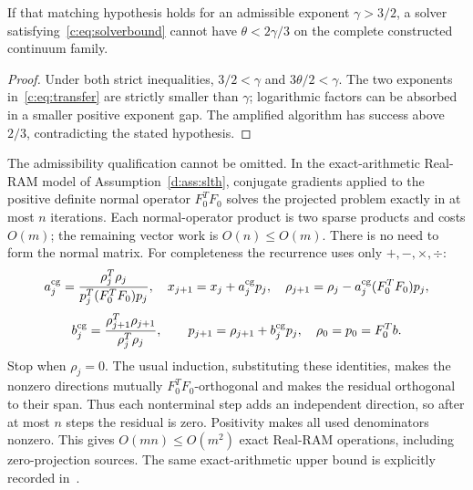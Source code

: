\begin{corollary}
\label{c:cor:hardness}
If that matching hypothesis holds for an admissible exponent
$\gamma>3/2$, a solver satisfying~\eqref{c:eq:solverbound} cannot have
$\theta<2\gamma/3$ on the complete constructed continuum family.
\end{corollary}
\begin{proof}
Under both strict inequalities, $3/2<\gamma$ and
$3\theta/2<\gamma$. The two exponents in~\eqref{c:eq:transfer} are
strictly smaller than $\gamma$; logarithmic factors can be absorbed
in a smaller positive exponent gap. The amplified algorithm has
success above $2/3$, contradicting the stated hypothesis.
\end{proof}

The admissibility qualification cannot be omitted. In the exact-arithmetic
Real-RAM model of Assumption~\ref{d:ass:slth}, conjugate gradients applied to the positive
 definite normal operator $F_0^TF_0$ solves the projected problem
exactly in at most $n$ iterations. Each normal-operator product is
two sparse products and costs $O(m)$; the remaining vector work is
$O(n)\le O(m)$. There is no need to form the normal matrix.
For completeness the recurrence uses only $+,-,\times,\div$:
\[
 a^{\rm cg}_j=\frac{\rho_j^T\rho_j}{p_j^T(F_0^TF_0)p_j},\quad
 x_{j+1}=x_j+a^{\rm cg}_jp_j,\quad
 \rho_{j+1}=\rho_j-a^{\rm cg}_j(F_0^TF_0)p_j,
\]
\[
 b^{\rm cg}_j=\frac{\rho_{j+1}^T\rho_{j+1}}{\rho_j^T\rho_j},\qquad
 p_{j+1}=\rho_{j+1}+b^{\rm cg}_jp_j,
 \quad \rho_0=p_0=F_0^Tb.
\]
Stop when $\rho_j=0$. The usual induction, substituting these identities,
makes the nonzero directions mutually $F_0^TF_0$-orthogonal and
makes the residual orthogonal to their span. Thus each nonterminal
step adds an independent direction, so after at most $n$ steps the
residual is zero. Positivity makes all used denominators nonzero.
This gives $O(mn)\le O(m^2)$ exact Real-RAM operations, including
zero-projection sources. The same exact-arithmetic upper bound is
explicitly recorded in~\citep[p.~3:2]{andoni2019}.

